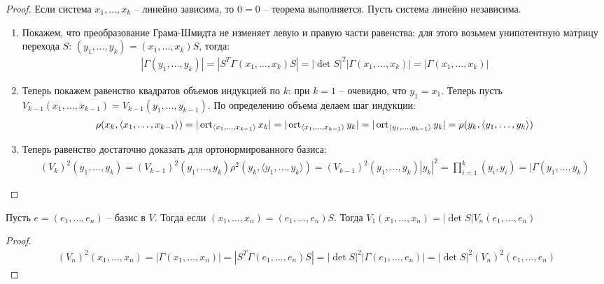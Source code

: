 \begin{proof}
    Если система $x_1, \dots, x_k$ -- линейно зависима, то $0 = 0$ -- теорема выполняется. Пусть система линейно независима.
    \begin{enumerate}
        \item Покажем, что преобразование Грама-Шмидта не изменяет левую и правую части равенства: для этого возьмем унипотентную матрицу перехода $S$: $(y_1, \dots, y_k) = (x_1, \dots, x_k)S$, тогда:
        \begin{gather*}
            |\Gamma(y_1, \dots, y_k)| = |S^T \Gamma(x_1, \dots, x_k)S| = |\det S|^2 |\Gamma(x_1, \dots, x_k)| = |\Gamma (x_1, \dots, x_k)|
        \end{gather*}
        \item Теперь покажем равенство квадратов объемов индукцией по $k$: при $k = 1$ -- очевидно, что $y_1 = x_1$. Теперь пусть $V_{k - 1} (x_1, \dots, x_{k - 1}) = V_{k - 1}(y_1, \dots, y_{k - 1})$. По определению объема делаем шаг индукции:
        \begin{gather*}
            \rho(x_k, \langle x_1, \dots, x_{k -1} \rangle) = |\operatorname{ort}_{\langle x_1, \dots, x_{k -1} \rangle} x_k| = |\operatorname{ort}_{\langle x_1, \dots, x_{k -1} \rangle} y_k| = |\operatorname{ort}_{\langle y_1, \dots, y_{k -1} \rangle} y_k| = \rho(y_k, \langle y_1, \dots, y_k \rangle)
        \end{gather*}
        \item Теперь равенство достаточно доказать для ортонормированного базиса:
        \begin{gather*}
            (V_k)^2(y_1, \dots, y_k) = (V_{k - 1})^2(y_1, \dots, y_k) \rho^2(y_k, \langle y_1, \dots, y_k \rangle) = (V_{k - 1})^2(y_1, \dots, y_k) |y_k|^2 = \displaystyle\prod_{i = 1}^{k} (y_i, y_i) = |\Gamma (y_1, \dots, y_k)
        \end{gather*}
    \end{enumerate}
\end{proof}

\begin{corollary}
    Пусть $e = (e_1, \dots, e_n)$ -- базис в $V$. Тогда если $(x_1, \dots, x_n) = (e_1, \dots, e_n)S$. Тогда $V_1(x_1, \dots, x_n) = |\det S| V_n(e_1, \dots, e_n)$
\end{corollary}

\begin{proof}
    \begin{gather*}
        (V_n)^2(x_1, \dots, x_n) = |\Gamma (x_1, \dots, x_n)| = |S^T \Gamma (e_1, \dots, e_n) S| = |\det S|^2 |\Gamma (e_1, \dots, e_n)| = |\det S|^2 (V_n)^2(e_1, \dots, e_n)
    \end{gather*}
\end{proof}

